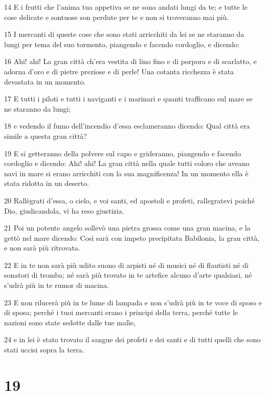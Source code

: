\par 14 E i frutti che l'anima tua appetiva se ne sono andati lungi da te; e tutte le cose delicate e sontuose son perdute per te e non si troveranno mai più.
\par 15 I mercanti di queste cose che sono stati arricchiti da lei se ne staranno da lungi per tema del suo tormento, piangendo e facendo cordoglio, e dicendo:
\par 16 Ahi! ahi! La gran città ch'era vestita di lino fino e di porpora e di scarlatto, e adorna d'oro e di pietre preziose e di perle! Una cotanta ricchezza è stata devastata in un momento.
\par 17 E tutti i piloti e tutti i naviganti e i marinari e quanti trafficano sul mare se ne staranno da lungi;
\par 18 e vedendo il fumo dell'incendio d'essa esclameranno dicendo: Qual città era simile a questa gran città?
\par 19 E si getteranno della polvere sul capo e grideranno, piangendo e facendo cordoglio e dicendo: Ahi! ahi! La gran città nella quale tutti coloro che aveano navi in mare si erano arricchiti con la sua magnificenza! In un momento ella è stata ridotta in un deserto.
\par 20 Rallègrati d'essa, o cielo, e voi santi, ed apostoli e profeti, rallegratevi poiché Dio, giudicandola, vi ha reso giustizia.
\par 21 Poi un potente angelo sollevò una pietra grossa come una gran macina, e la gettò nel mare dicendo: Così sarà con impeto precipitata Babilonia, la gran città, e non sarà più ritrovata.
\par 22 E in te non sarà più udito suono di arpisti né di musici né di flautisti né di sonatori di tromba; né sarà più trovato in te artefice alcuno d'arte qualsiasi, né s'udrà più in te rumor di macina.
\par 23 E non rilucerà più in te lume di lampada e non s'udrà più in te voce di sposo e di sposa; perché i tuoi mercanti erano i principi della terra, perché tutte le nazioni sono state sedotte dalle tue malìe,
\par 24 e in lei è stato trovato il sangue dei profeti e dei santi e di tutti quelli che sono stati uccisi sopra la terra.

\chapter{19}

